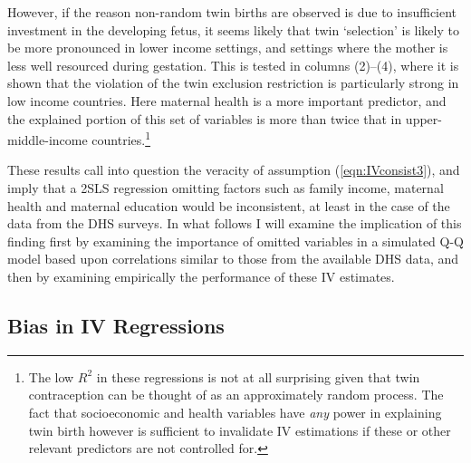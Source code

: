\documentclass{article}[11pt,subeqn]
\begin{document}
\begin{spacing}{1.5}
However, if the reason non-random twin births are observed is due to insufficient investment in the developing fetus, it seems likely that
 twin `selection' is likely to be more pronounced in lower income settings, and settings where the mother is less well resourced during gestation.  
This is tested in columns (2)--(4), where it is shown that the violation of the twin exclusion restriction is particularly
strong in low income countries.  Here maternal health is a more important predictor, and the explained portion of this set of variables is more than
twice that in upper-middle-income countries.\footnote{The low $R^2$ in these regressions is not at all surprising given that twin contraception
can be thought of as an approximately random process.  The fact that socioeconomic and health variables have \emph{any} power in explaining
twin birth however is sufficient to invalidate IV estimations if these or other relevant predictors are not controlled for.}

These results call into question the veracity of assumption (\ref{eqn:IVconsist3}), and imply that a 2SLS regression omitting factors such as family
income, maternal health and maternal education would be inconsistent, at least in the case of the data from the DHS surveys.  In what follows
I will examine the implication of this finding first by examining the importance of omitted variables in a simulated Q-Q model based upon
correlations similar to those from the available DHS data, and then by examining empirically the performance of these IV estimates.  
\subsection{Bias in IV Regressions}
\label{scn:bias}

\end{spacing}
\end{document}
